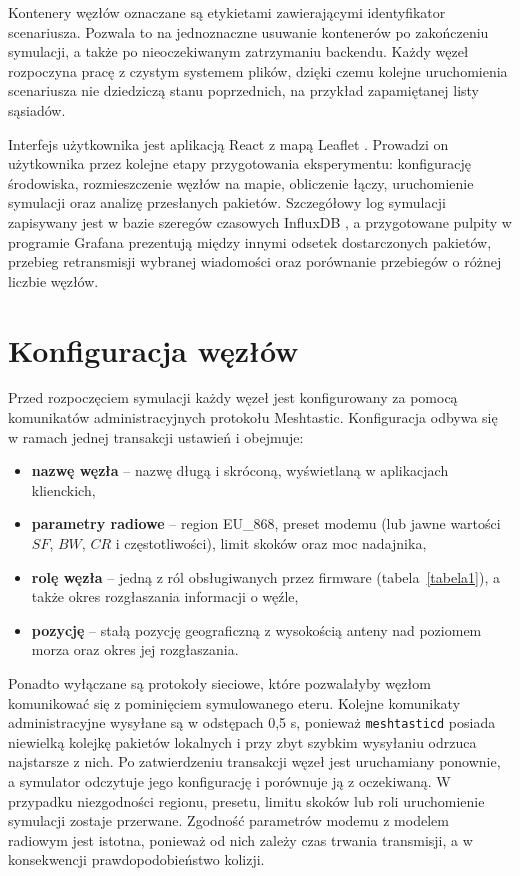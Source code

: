 Kontenery węzłów oznaczane są etykietami zawierającymi identyfikator scenariusza. Pozwala to na jednoznaczne usuwanie kontenerów po zakończeniu symulacji, a także po nieoczekiwanym zatrzymaniu backendu. Każdy węzeł rozpoczyna pracę z czystym systemem plików, dzięki czemu kolejne uruchomienia scenariusza nie dziedziczą stanu poprzednich, na przykład zapamiętanej listy sąsiadów.

Interfejs użytkownika jest aplikacją React z mapą Leaflet \cite{leaflet}. Prowadzi on użytkownika przez kolejne etapy przygotowania eksperymentu: konfigurację środowiska, rozmieszczenie węzłów na mapie, obliczenie łączy, uruchomienie symulacji oraz analizę przesłanych pakietów. Szczegółowy log symulacji zapisywany jest w bazie szeregów czasowych InfluxDB \cite{influxdb}, a przygotowane pulpity w programie Grafana prezentują między innymi odsetek dostarczonych pakietów, przebieg retransmisji wybranej wiadomości oraz porównanie przebiegów o różnej liczbie węzłów.

\section{Konfiguracja węzłów}

Przed rozpoczęciem symulacji każdy węzeł jest konfigurowany za pomocą komunikatów administracyjnych protokołu Meshtastic. Konfiguracja odbywa się w ramach jednej transakcji ustawień i obejmuje:

\begin{itemize}
\item \textbf{nazwę węzła} -- nazwę długą i skróconą, wyświetlaną w aplikacjach klienckich,
\item \textbf{parametry radiowe} -- region EU\_868, preset modemu (lub jawne wartości \(SF\), \(BW\), \(CR\) i częstotliwości), limit skoków oraz moc nadajnika,
\item \textbf{rolę węzła} -- jedną z ról obsługiwanych przez firmware (tabela~\ref{tabela1}), a także okres rozgłaszania informacji o węźle,
\item \textbf{pozycję} -- stałą pozycję geograficzną z wysokością anteny nad poziomem morza oraz okres jej rozgłaszania.
\end{itemize}

Ponadto wyłączane są protokoły sieciowe, które pozwalałyby węzłom komunikować się z pominięciem symulowanego eteru. Kolejne komunikaty administracyjne wysyłane są w odstępach 0,5 s, ponieważ \texttt{meshtasticd} posiada niewielką kolejkę pakietów lokalnych i przy zbyt szybkim wysyłaniu odrzuca najstarsze z nich. Po zatwierdzeniu transakcji węzeł jest uruchamiany ponownie, a symulator odczytuje jego konfigurację i porównuje ją z oczekiwaną. W przypadku niezgodności regionu, presetu, limitu skoków lub roli uruchomienie symulacji zostaje przerwane. Zgodność parametrów modemu z modelem radiowym jest istotna, ponieważ od nich zależy czas trwania transmisji, a w konsekwencji prawdopodobieństwo kolizji.

